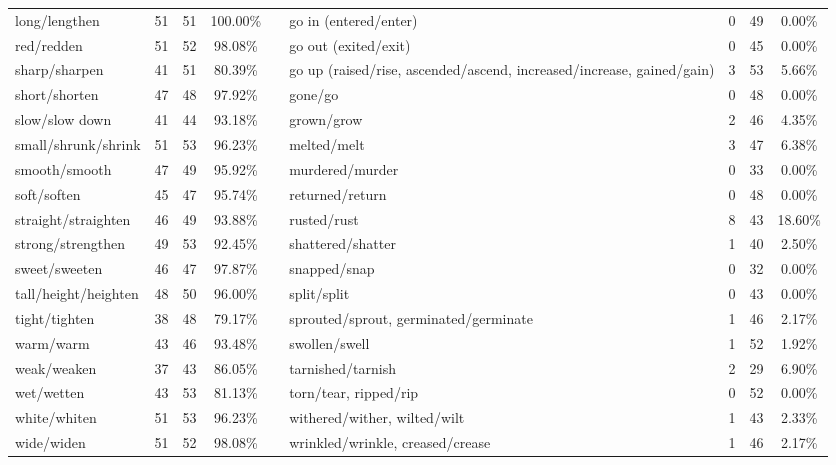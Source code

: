 \begin{tabular}{p{3cm}ccccp{3cm}ccc}
long/lengthen & 51 & 51 & 100.00\% & & go in (entered/enter) & 0 & 49 & 0.00\% \\
red/redden & 51 & 52 & 98.08\% & & go out (exited/exit) & 0 & 45 & 0.00\% \\
sharp/sharpen & 41 & 51 & 80.39\% & & go up (raised/rise, ascended/ascend, increased/increase, gained/gain) & 3 & 53 & 5.66\% \\
short/shorten & 47 & 48 & 97.92\% & & gone/go & 0 & 48 & 0.00\% \\
slow/slow down & 41 & 44 & 93.18\% & & grown/grow & 2 & 46 & 4.35\% \\
small/shrunk/shrink & 51 & 53 & 96.23\% & & melted/melt & 3 & 47 & 6.38\% \\
smooth/smooth & 47 & 49 & 95.92\% & & murdered/murder & 0 & 33 & 0.00\% \\
soft/soften & 45 & 47 & 95.74\% & & returned/return & 0 & 48 & 0.00\% \\
straight/straighten & 46 & 49 & 93.88\% & & rusted/rust & 8 & 43 & 18.60\% \\
strong/strengthen & 49 & 53 & 92.45\% & & shattered/shatter & 1 & 40 & 2.50\% \\
sweet/sweeten & 46 & 47 & 97.87\% & & snapped/snap & 0 & 32 & 0.00\% \\
tall/height/heighten & 48 & 50 & 96.00\% & & split/split & 0 & 43 & 0.00\% \\
tight/tighten & 38 & 48 & 79.17\% & & sprouted/sprout, germinated/germinate & 1 & 46 & 2.17\% \\
warm/warm & 43 & 46 & 93.48\% & & swollen/swell & 1 & 52 & 1.92\% \\
weak/weaken & 37 & 43 & 86.05\% & & tarnished/tarnish & 2 & 29 & 6.90\% \\
wet/wetten & 43 & 53 & 81.13\% & & torn/tear, ripped/rip & 0 & 52 & 0.00\% \\
white/whiten & 51 & 53 & 96.23\% & & withered/wither, wilted/wilt & 1 & 43 & 2.33\% \\
wide/widen & 51 & 52 & 98.08\% & & wrinkled/wrinkle, creased/crease & 1 & 46 & 2.17\%
\end{tabular}